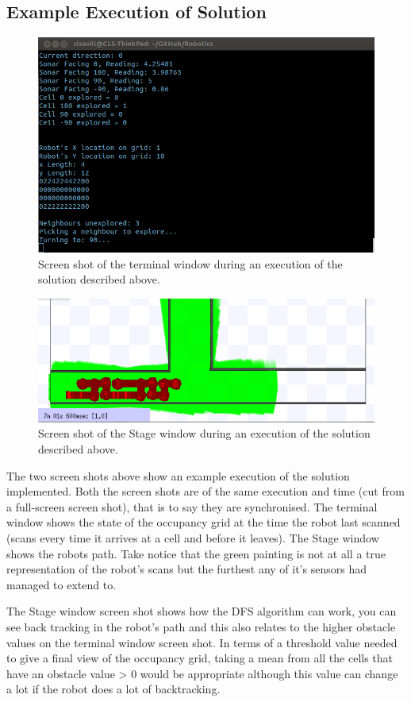 \documentclass[a4paper,12pt]{article}
\begin{document}
\subsection{Example Execution of Solution}

\begin{figure}[H]
\includegraphics[scale=0.8]{robotics1Terminal.png}
\caption{Screen shot of the terminal window during an execution of the solution described above.}
\end{figure}

\begin{figure}[H]
\includegraphics[scale=0.9]{robotics2Stage.png}
\caption{Screen shot of the Stage window during an execution of the solution described above.}
\end{figure}

\noindent The two screen shots above show an example execution of the solution implemented. Both the screen shots are of the same execution and time (cut from a full-screen screen shot), that is to say they are synchronised. The terminal window shows the state of the occupancy grid at the time the robot last scanned (scans every time it arrives at a cell and before it leaves). The Stage window shows the robots path. Take notice that the green painting is not at all a true representation of the robot's scans but the furthest any of it's sensors had managed to extend to.

\vspace{5mm}
\noindent The Stage window screen shot shows how the DFS algorithm can work, you can see back tracking in the robot's path and this also relates to the higher obstacle values on the terminal window screen shot. In terms of a threshold value needed to give a final view of the occupancy grid, taking a mean from all the cells that have an obstacle value > 0 would be appropriate although this value can change a lot if the robot does a lot of backtracking.
\end{document}
